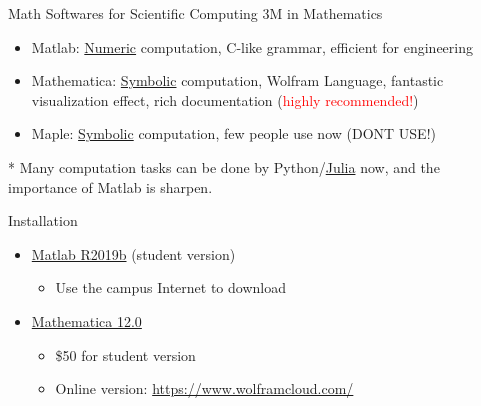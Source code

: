 \documentclass{../TexTemplate/myslide}
\begin{document}
\begin{frame}{Math Softwares for Scientific Computing}
3M in Mathematics
\begin{itemize}
	\item Matlab: \underline{Numeric} computation, C-like grammar, efficient for engineering
	\item Mathematica: \underline{Symbolic} computation, Wolfram Language, fantastic visualization effect, rich documentation (\textcolor{red}{highly recommended!})
	\item Maple: \underline{Symbolic} computation, few people use now (DONT USE!)
\end{itemize}
* Many computation tasks can be done by Python/\href{https://julia.mit.edu/}{Julia} now, and the importance of Matlab is sharpen.
\end{frame}

\begin{frame}{Installation}
\begin{itemize}
	\item \href{https://software.sysu.edu.cn/matlabhome}{Matlab R2019b} (student version)
	\begin{itemize}
		\item Use the campus Internet to download
	\end{itemize}
	\item \href{https://tiebamma.github.io/InstallTutorial}{Mathematica 12.0}
	\begin{itemize}
		\item \$50 for student version
		\item Online version: \url{https://www.wolframcloud.com/}
	\end{itemize}
\end{itemize}
\end{frame}
\end{document}
